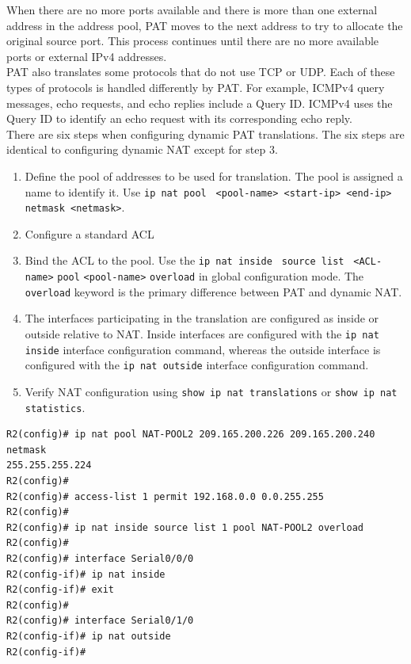 When there are no more ports available and there is more than one external address in the address pool, PAT moves to the next address to try to allocate the original source port. This process continues until there are no more available ports or external IPv4 addresses.\\

PAT also translates some protocols that do not use TCP or UDP. Each of these types of protocols is handled differently by PAT. For example, ICMPv4 query messages, echo requests, and echo replies include a Query ID. ICMPv4 uses the Query ID to identify an echo request with its corresponding echo reply. \\

There are six steps when configuring dynamic PAT translations. The six steps are identical to configuring dynamic NAT except for step 3.

\begin{enumerate}
\item Define the pool of addresses to be used for translation. The pool is assigned a name to identify it. Use \verb|ip nat pool | \verb|<pool-name> <start-ip> <end-ip>| \verb|netmask <netmask>|.

\item Configure a standard ACL

\item Bind the ACL to the pool. Use the \verb|ip nat inside | \verb|source list | \verb|<ACL-name>| \verb|pool| \verb|<pool-name>| \verb|overload| in global configuration mode. The \verb|overload| keyword is the primary difference between PAT and dynamic NAT.

\item The interfaces participating in the translation are configured as inside or outside relative to NAT. Inside interfaces are configured with the \verb|ip nat inside| interface configuration command, whereas the outside interface is configured with the \verb|ip nat outside| interface configuration command.

\item Verify NAT configuration using \verb|show ip nat translations| or \verb|show ip nat statistics|. 
\end{enumerate}

\begin{verbatim}
R2(config)# ip nat pool NAT-POOL2 209.165.200.226 209.165.200.240 netmask
255.255.255.224
R2(config)#
R2(config)# access-list 1 permit 192.168.0.0 0.0.255.255
R2(config)#
R2(config)# ip nat inside source list 1 pool NAT-POOL2 overload
R2(config)#
R2(config)# interface Serial0/0/0
R2(config-if)# ip nat inside
R2(config-if)# exit
R2(config)#
R2(config)# interface Serial0/1/0
R2(config-if)# ip nat outside
R2(config-if)#
\end{verbatim}

